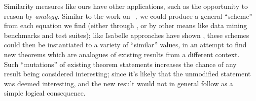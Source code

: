 Similarity measures like ours have other applications, such as the opportunity
to reason by \emph{analogy}. Similar to the work on
\aclml{}~\cite{heras2013proof}, we could produce a general ``scheme'' from each
equation we find (either through \quickspec{}, or by other means like data
mining benchmarks and test suites); like Isabelle approaches have shown
\cite{Montano-Rivas.McCasland.Dixon.ea:2012}, these schemes could then be
instantiated to a variety of ``similar'' values, in an attempt to find new
theorems which are analogues of existing results from a different context.
Such ``mutations'' of existing theorem statements increases the chance of any
result being considered interesting; since it's likely that the unmodified
statement was deemed interesting, and the new result would not in general follow
as a simple logical consequence.
